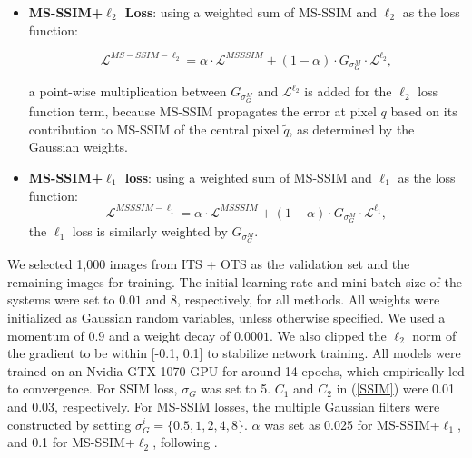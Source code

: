 \documentclass[10pt,twocolumn,letterpaper]{article}
\begin{document}
\begin{itemize}[noitemsep,topsep=2pt,parsep=2pt,partopsep=2pt]
\item \textbf{MS-SSIM+$\ell_2$ Loss}: using a weighted sum of MS-SSIM and $\ell_2$ as the loss function:

\begin{equation}
\label{MSSSIM-L2}
\mathcal{L}^{MS-SSIM-\ell_2} = \alpha \cdot \mathcal{L}^{MSSSIM} + (1-\alpha)\cdot G_{\sigma_{G}^M} \cdot \mathcal{L}^{\ell_2},
\end{equation}

\noindent a point-wise multiplication between $G_{\sigma_{G}^M}$ and $\mathcal{L}^{\ell_2}$ is added for the $\ell_2$ loss function term, because MS-SSIM propagates the error at pixel $q$ based on its contribution to MS-SSIM of the central pixel $\widetilde q$, as determined by the Gaussian weights.

\item \textbf{MS-SSIM+$\ell_1$ loss}: using a weighted sum of MS-SSIM and $\ell_1$ as the loss function:
\begin{equation}
\label{MSSSIM-L1}
\mathcal{L}^{MSSSIM-\ell_1} = \alpha \cdot \mathcal{L}^{MSSSIM} + (1-\alpha)\cdot G_{\sigma_{G}^M} \cdot \mathcal{L}^{\ell_1},
\end{equation}
\noindent the $\ell_1$ loss is similarly weighted by $G_{\sigma_{G}^M}$.

\end{itemize}

We selected 1,000 images from ITS + OTS as the validation set and the remaining images for training. The initial learning rate and mini-batch size of the systems were set to $0.01$ and $8$, respectively, for all methods. All weights were initialized as Gaussian random variables, unless otherwise specified. We used a momentum of $0.9$ and a weight decay of $0.0001$. We also clipped the $\ell_2$ norm of the gradient to be within [-0.1, 0.1] to stabilize network training. All models were trained on an Nvidia GTX 1070 GPU for around 14 epochs, which empirically led to convergence. For SSIM loss, $\sigma_G$ was set to 5. $C_1$ and $C_2$ in (\ref{SSIM}) were 0.01 and 0.03, respectively. For MS-SSIM losses, the multiple Gaussian filters were constructed by setting $\sigma_G^i=\{0.5, 1, 2, 4, 8\}$. $\alpha$ was set as 0.025 for MS-SSIM+$\ell_1$, and 0.1 for MS-SSIM+$\ell_2$, following \cite{zhao2017loss}. 
\end{document}

